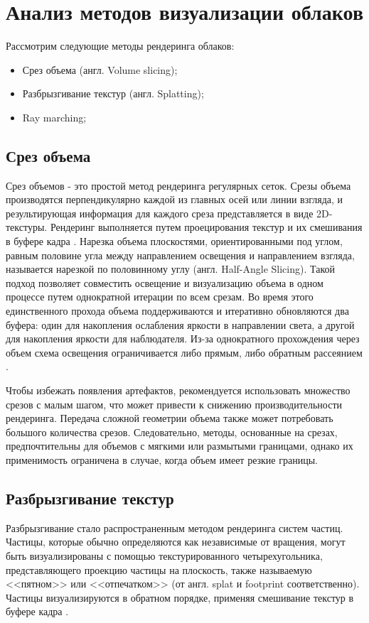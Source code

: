 \section{Анализ методов визуализации облаков}

Рассмотрим следующие методы рендеринга облаков:

\begin{itemize}
	\item Срез объема (англ. Volume slicing);
	\item Разбрызгивание текстур (англ. Splatting);
	\item Ray marching;
\end{itemize}


\subsection{Срез объема}
\label{slice}
Срез объемов - это простой метод рендеринга регулярных сеток. Срезы объема производятся перпендикулярно каждой из главных осей или линии взгляда, и результирующая информация для каждого среза представляется в виде 2D-текстуры. Рендеринг выполняется путем проецирования текстур и их смешивания в буфере кадра \cite{vs}. Нарезка объема плоскостями, ориентированными под углом, равным половине угла между направлением освещения и направлением взгляда, называется нарезкой по половинному углу (англ. Half-Angle Slicing). Такой подход позволяет совместить освещение и визуализацию объема в одном процессе путем однократной итерации по всем срезам. Во время этого единственного прохода объема поддерживаются и итеративно обновляются два буфера: один для накопления ослабления яркости в направлении света, а другой для накопления яркости для наблюдателя. Из-за однократного прохождения через объем схема освещения ограничивается либо прямым, либо обратным рассеянием \cite{clouds}. 

Чтобы избежать появления артефактов, рекомендуется использовать множество срезов с малым шагом, что может привести к снижению производительности рендеринга. Передача сложной геометрии объема также может потребовать большого количества срезов. Следовательно, методы, основанные на срезах, предпочтительны для объемов с мягкими или размытыми границами, однако их применимость ограничена в случае, когда объем имеет резкие границы.

\subsection{Разбрызгивание текстур}
\label{splatting}
Разбрызгивание стало распространенным методом рендеринга систем частиц. Частицы, которые обычно определяются как независимые от вращения, могут быть визуализированы с помощью текстурированного четырехугольника, представляющего проекцию частицы на плоскость, также называемую <<пятном>> или <<отпечатком>> (от англ. splat и footprint соответственно). Частицы визуализируются в обратном порядке, применяя смешивание текстур в буфере кадра \cite{voxel, clouds}. 

